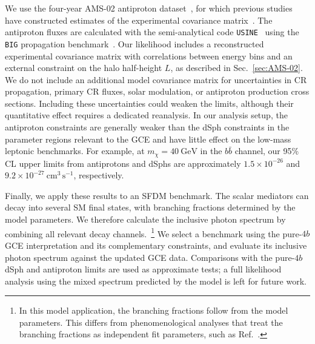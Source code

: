 \documentclass[superscriptaddress,
showpacs,preprintnumbers,nofootinbib,eqsecnum,amsmath,amssymb,aps,11pt, groupedaddress, floatfix]{revtex4-2}
\begin{document}
We use the four-year AMS-02 antiproton dataset~\cite{AMS:2016oqu}, for which previous studies have constructed estimates of the experimental covariance
matrix~\cite{Boudaud:2019efq}.
The antiproton fluxes are calculated with the semi-analytical code \texttt{USINE}~\cite{Maurin:2018rmm} using the
\texttt{BIG} propagation benchmark~\cite{Genolini:2019ewc}.
Our likelihood includes a reconstructed experimental covariance
matrix with correlations between energy bins and an external constraint on the halo half-height $L$, as described in
Sec.~\ref{sec:AMS-02}.
We do not include an additional model covariance matrix for
uncertainties in CR propagation, primary CR fluxes, solar
modulation, or antiproton production cross sections.
Including these uncertainties could weaken the limits, although
their quantitative effect requires a dedicated reanalysis.
In our analysis setup, the antiproton constraints are generally
weaker than the dSph constraints in the parameter regions relevant
to the GCE and have little effect on the low-mass leptonic
benchmarks.
For example, at $m_\chi = 40~\mathrm{GeV}$ in the $b\bar b$ channel,
our 95\% CL upper limits from antiprotons and dSphs are
approximately $1.5\times10^{-26}$ and
$9.2\times10^{-27}~\mathrm{cm^3\,s^{-1}}$, respectively.

Finally, we apply these results to an SFDM benchmark.
The scalar mediators can decay into several SM final states, with branching fractions determined by the model parameters.
We therefore calculate the inclusive photon spectrum by combining all relevant decay channels.~\footnote{In this model
application, the branching fractions follow from the model
parameters. This differs from phenomenological analyses that
treat the branching fractions as independent fit parameters,
such as Ref.~\cite{DiMauro:2021qcf}.}
We select a benchmark using the pure-$4b$ GCE interpretation
and its complementary constraints, and evaluate its inclusive
photon spectrum against the updated GCE data.
Comparisons with the pure-$4b$ dSph and antiproton limits are
used as approximate tests; a full likelihood analysis using
the mixed spectrum predicted by the model is left for future
work.
\end{document}

